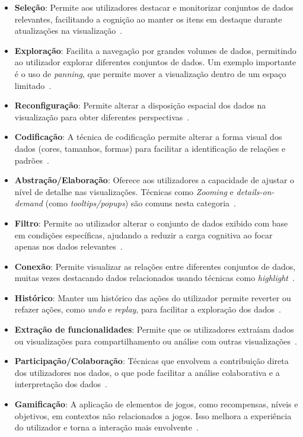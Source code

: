 \begin{itemize}
    \item \textbf{Seleção}: Permite aos utilizadores destacar e monitorizar conjuntos de dados relevantes, facilitando a cognição ao manter os itens em destaque durante atualizações na visualização~\cite{yi2007toward, figueiras2015towards}.
    \item \textbf{Exploração}: Facilita a navegação por grandes volumes de dados, permitindo ao utilizador explorar diferentes conjuntos de dados. Um exemplo importante é o uso de \textit{panning}, que permite mover a visualização dentro de um espaço limitado~\cite{yi2007toward, figueiras2015towards}.
    \item \textbf{Reconfiguração}: Permite alterar a disposição espacial dos dados na visualização para obter diferentes perspectivas~\cite{yi2007toward, figueiras2015towards}.
    \item \textbf{Codificação}: A técnica de codificação permite alterar a forma visual dos dados (cores, tamanhos, formas) para facilitar a identificação de relações e padrões~\cite{yi2007toward}.
    \item \textbf{Abstração/Elaboração}: Oferece aos utilizadores a capacidade de ajustar o nível de detalhe nas visualizações. Técnicas como \textit{Zooming} e \textit{details-on-demand} (como \textit{tooltips/popups}) são comuns nesta categoria~\cite{yi2007toward, figueiras2015towards}.
    \item \textbf{Filtro}: Permite ao utilizador alterar o conjunto de dados exibido com base em condições específicas, ajudando a reduzir a carga cognitiva ao focar apenas nos dados relevantes~\cite{figueiras2015towards, yi2007toward}.
    \item \textbf{Conexão}: Permite visualizar as relações entre diferentes conjuntos de dados, muitas vezes destacando dados relacionados usando técnicas como \textit{highlight}~\cite{figueiras2015towards}.
    \item \textbf{Histórico}: Manter um histórico das ações do utilizador permite reverter ou refazer ações, como \textit{undo} e \textit{replay}, para facilitar a exploração dos dados~\cite{heer2012interactive}.
    \item \textbf{Extração de funcionalidades}: Permite que os utilizadores extraíam dados ou visualizações para compartilhamento ou análise com outras visualizações~\cite{figueiras2015towards, heer2012interactive}.
    \item \textbf{Participação/Colaboração}: Técnicas que envolvem a contribuição direta dos utilizadores nos dados, o que pode facilitar a análise colaborativa e a interpretação dos dados~\cite{figueiras2015towards}.
    \item \textbf{Gamificação}: A aplicação de elementos de jogos, como recompensas, níveis e objetivos, em contextos não relacionados a jogos. Isso melhora a experiência do utilizador e torna a interação mais envolvente~\cite{deterding2011game, figueiras2015towards}.
\end{itemize}

